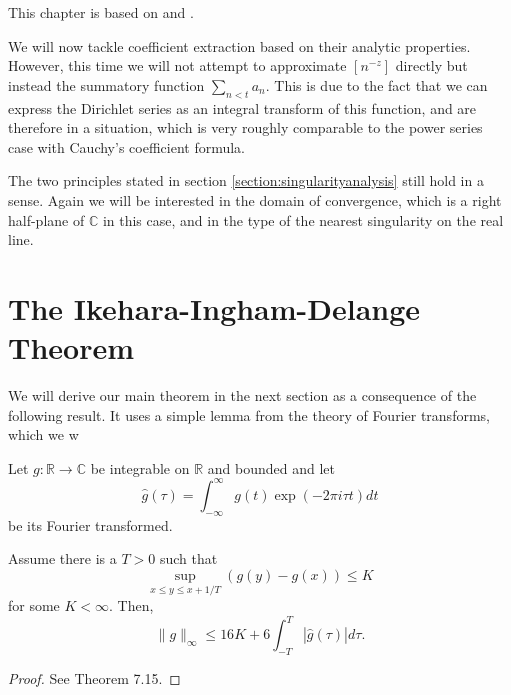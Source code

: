 This chapter is based on \cite{numbertheory1} and \cite{numbertheory2}.

We will now tackle coefficient extraction based on their analytic properties. 
However, this time we will not attempt to approximate $[n^{-z}]$ directly but instead the summatory function $\sum_{n < t} a_n$. 
This is due to the fact that we can express the Dirichlet series as an integral transform of this function, and are therefore in a situation, which is very roughly comparable to the power series case with Cauchy's coefficient formula.

The two principles stated in section \ref{section:singularityanalysis} still hold in a sense. 
Again we will be interested in the domain of convergence, which is a right half-plane of $\mathbb{C}$ in this case, and in the type of the nearest singularity on the real line.

\section{The Ikehara-Ingham-Delange Theorem}

We will derive our main theorem in the next section as a consequence of the following result.
It uses a simple lemma from the theory of Fourier transforms, which we w

\begin{lem}
\label{thm:lemma}
Let $g: \mathbb{R} \to \mathbb{C}$ be integrable on $\mathbb{R}$ and bounded and let 
\[
\hat{g}(\tau) = \int_{-\infty}^\infty g(t) \exp(-2\pi i \tau t) dt
\]
be its Fourier transformed.

Assume there is a $T > 0$ such that 
\begin{equation}
\label{eq:fourier cond}
\sup_{x \leq y \leq x + 1/T} (g(y) - g(x)) \leq K
\end{equation}
for some $K < \infty$.
Then, 
\[
    \lVert g \rVert_\infty \leq 16 K + 6 \int_{-T}^T |\hat{g}(\tau)| d\tau.
\]
\end{lem}
\begin{proof}
See \cite{numbertheory2} Theorem 7.15.
\end{proof}


